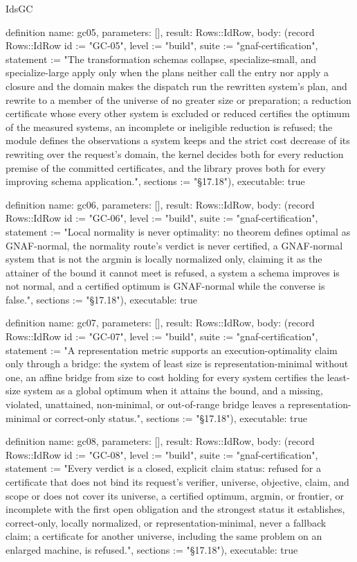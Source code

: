 \begin{lexlean}{IdsGC}
\begin{semanticmodule}
definition{
  name: gc05,
  parameters: [],
  result: Rows::IdRow,
  body: (record Rows::IdRow {id := "GC-05", level := "build", suite := "gnaf-certification", statement := "The transformation schemas collapse, specialize-small, and specialize-large apply only when the plans neither call the entry nor apply a closure and the domain makes the dispatch run the rewritten system's plan, and rewrite to a member of the universe of no greater size or preparation; a reduction certificate whose every other system is excluded or reduced certifies the optimum of the measured systems, an incomplete or ineligible reduction is refused; the module defines the observations a system keeps and the strict cost decrease of its rewriting over the request's domain, the kernel decides both for every reduction premise of the committed certificates, and the library proves both for every improving schema application.", sections := "§17.18"}),
  executable: true
}

definition{
  name: gc06,
  parameters: [],
  result: Rows::IdRow,
  body: (record Rows::IdRow {id := "GC-06", level := "build", suite := "gnaf-certification", statement := "Local normality is never optimality: no theorem defines optimal as GNAF-normal, the normality route's verdict is never certified, a GNAF-normal system that is not the argmin is locally normalized only, claiming it as the attainer of the bound it cannot meet is refused, a system a schema improves is not normal, and a certified optimum is GNAF-normal while the converse is false.", sections := "§17.18"}),
  executable: true
}

definition{
  name: gc07,
  parameters: [],
  result: Rows::IdRow,
  body: (record Rows::IdRow {id := "GC-07", level := "build", suite := "gnaf-certification", statement := "A representation metric supports an execution-optimality claim only through a bridge: the system of least size is representation-minimal without one, an affine bridge from size to cost holding for every system certifies the least-size system as a global optimum when it attains the bound, and a missing, violated, unattained, non-minimal, or out-of-range bridge leaves a representation-minimal or correct-only status.", sections := "§17.18"}),
  executable: true
}

definition{
  name: gc08,
  parameters: [],
  result: Rows::IdRow,
  body: (record Rows::IdRow {id := "GC-08", level := "build", suite := "gnaf-certification", statement := "Every verdict is a closed, explicit claim status: refused for a certificate that does not bind its request's verifier, universe, objective, claim, and scope or does not cover its universe, a certified optimum, argmin, or frontier, or incomplete with the first open obligation and the strongest status it establishes, correct-only, locally normalized, or representation-minimal, never a fallback claim; a certificate for another universe, including the same problem on an enlarged machine, is refused.", sections := "§17.18"}),
  executable: true
}


\end{semanticmodule}
\end{lexlean}
